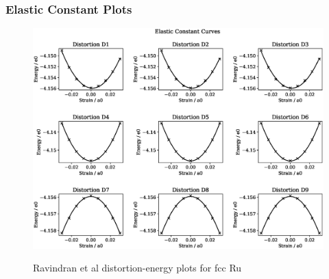 \clearpage
\subsubsection{Elastic Constant Plots}

\begin{figure}[htb]
\centering
\includegraphics[width=.90\linewidth]{chapters/potentials_fe_pd_ru/feru_potential/ec_rfkj/elastic_strains_bp_0.eps}  
\label{fig:feru-rufcc-rose}
\caption{Ravindran et al\cite{dfttisiravindran} distortion-energy plots for \acrshort{fcc} Ru}
\end{figure}

